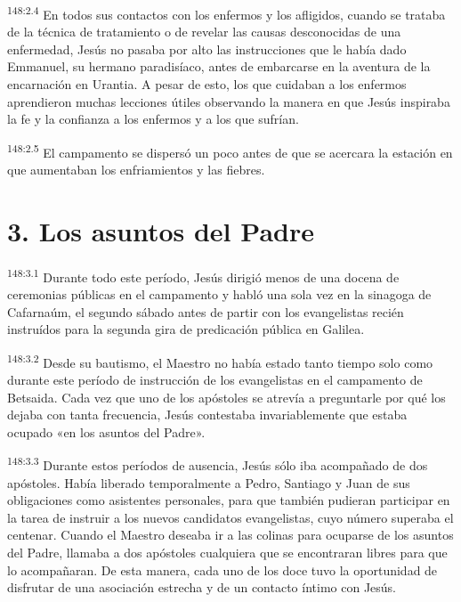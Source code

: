 \par 
\textsuperscript{148:2.4} En todos sus contactos con los enfermos y los afligidos, cuando se trataba de la técnica de tratamiento o de revelar las causas desconocidas de una enfermedad, Jesús no pasaba por alto las instrucciones que le había dado Emmanuel, su hermano paradisíaco, antes de embarcarse en la aventura de la encarnación en Urantia. A pesar de esto, los que cuidaban a los enfermos aprendieron muchas lecciones útiles observando la manera en que Jesús inspiraba la fe y la confianza a los enfermos y a los que sufrían.

\par 
\textsuperscript{148:2.5} El campamento se dispersó un poco antes de que se acercara la estación en que aumentaban los enfriamientos y las fiebres.

\section*{3. Los asuntos del Padre}
\par 
\textsuperscript{148:3.1} Durante todo este período, Jesús dirigió menos de una docena de ceremonias públicas en el campamento y habló una sola vez en la sinagoga de Cafarnaúm, el segundo sábado antes de partir con los evangelistas recién instruídos para la segunda gira de predicación pública en Galilea.

\par 
\textsuperscript{148:3.2} Desde su bautismo, el Maestro no había estado tanto tiempo solo como durante este período de instrucción de los evangelistas en el campamento de Betsaida. Cada vez que uno de los apóstoles se atrevía a preguntarle por qué los dejaba con tanta frecuencia, Jesús contestaba invariablemente que estaba ocupado «en los asuntos del Padre».

\par 
\textsuperscript{148:3.3} Durante estos períodos de ausencia, Jesús sólo iba acompañado de dos apóstoles. Había liberado temporalmente a Pedro, Santiago y Juan de sus obligaciones como asistentes personales, para que también pudieran participar en la tarea de instruir a los nuevos candidatos evangelistas, cuyo número superaba el centenar. Cuando el Maestro deseaba ir a las colinas para ocuparse de los asuntos del Padre, llamaba a dos apóstoles cualquiera que se encontraran libres para que lo acompañaran. De esta manera, cada uno de los doce tuvo la oportunidad de disfrutar de una asociación estrecha y de un contacto íntimo con Jesús.

